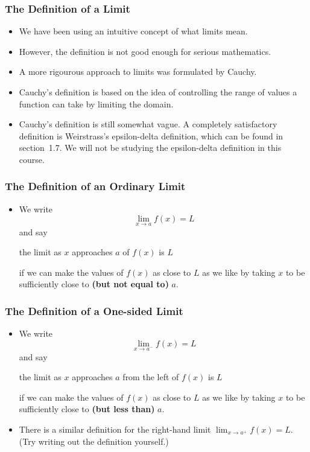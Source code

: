 \documentclass[serif,ignorenonframetext]{beamer}
\begin{document}
\begin{frame}
  \frametitle{The Definition of a Limit}
  \begin{itemize}
  \item We have been using an intuitive concept of what limits mean.
    
    \pause
  \item However, the definition is not good enough for serious
    mathematics.
  
    \pause
  \item A more rigourous approach to limits was formulated by Cauchy.
    
    \pause
  \item Cauchy's definition is based on the idea of controlling the
    range of values a function can take by limiting the domain.
    
    \pause
  \item Cauchy's definition is still somewhat vague.  A completely
    satisfactory definition is Weirstrass's epsilon-delta definition,
    which can be found in section~1.7.  We will not be studying the
    epsilon-delta definition in this course.
  \end{itemize}
\end{frame}

\begin{frame}
  \frametitle{The Definition of an Ordinary Limit}
  \begin{itemize}
  \item We write
    \begin{displaymath}
      \lim_{x\to a} f(x) = L
    \end{displaymath}
    and say 
    \begin{center}
      the limit as $x$ approaches $a$ of $f(x)$ is $L$
    \end{center}
    if we can make the values of $f(x)$ as close to $L$ as we like by
    taking $x$ to be sufficiently close to \textbf{(but not equal to)}
    $a$.
  \end{itemize}
\end{frame}

\begin{frame}
  \frametitle{The Definition of a One-sided Limit}
  \begin{itemize}
  \item We write
    \begin{displaymath}
      \lim_{x\to a^-} f(x) = L
    \end{displaymath}
    and say
    \begin{center}
      the limit as $x$ approaches $a$ from the left of $f(x)$ is $L$
    \end{center}
    if we can make the values of $f(x)$ as close to $L$ as we like by
    taking $x$ to be sufficiently close to \textbf{(but less than)}
    $a$.

    \pause
  \item There is a similar definition for the right-hand limit
    $\displaystyle\lim_{x\to a^+} f(x)=L$.  (Try writing out the
    definition yourself.)
  \end{itemize}
\end{frame}
\end{document}
